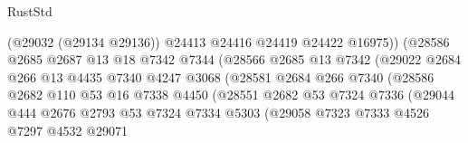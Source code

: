 \begin{lexlean}{RustStd}
\begin{coremodule}
                                    (@29032 (@29134 @29136))
                                    @24413
                                    @24416
                                    @24419
                                    @24422
                                    @16975))
                                (@28586
                                  @2685
                                  @2687
                                  @13
                                  @18
                                  @7342
                                  @7344
                                  (@28566
                                    @2685
                                    @13
                                    @7342
                                    (@29022
                                      @2684
                                      @266
                                      @13
                                      @4435
                                      @7340
                                      @4247
                                      @3068
                                      (@28581
                                        @2684
                                        @266
                                        @7340
                                        (@28586
                                          @2682
                                          @110
                                          @53
                                          @16
                                          @7338
                                          @4450
                                          (@28551
                                            @2682
                                            @53
                                            @7324
                                            @7336
                                            (@29044
                                              @444
                                              @2676
                                              @2793
                                              @53
                                              @7324
                                              @7334
                                              @5303
                                              (@29058
                                                @7323
                                                @7333
                                                @4526
                                                @7297
                                                @4532
                                                @29071

\end{coremodule}
\end{lexlean}
